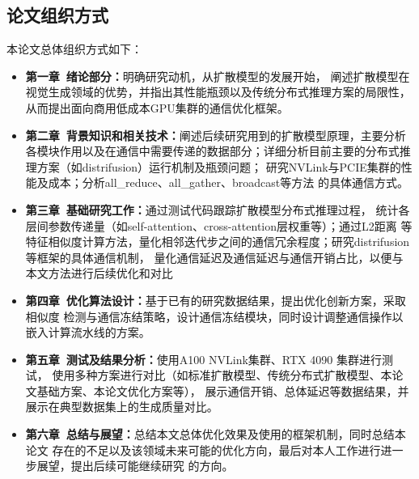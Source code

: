 \subsection{论文组织方式}
\par
本论文总体组织方式如下：
\begin{itemize}
    \item {\bfseries 第一章\ 绪论部分：}明确研究动机，从扩散模型的发展开始，
    阐述扩散模型在视觉生成领域的优势，并指出其性能瓶颈以及传统分布式推理方案的局限性，
    从而提出面向商用低成本GPU集群的通信优化框架。
    \item {\bfseries 第二章\ 背景知识和相关技术：}阐述后续研究用到的扩散模型原理，主要分析
    各模块作用以及在通信中需要传递的数据部分；详细分析目前主要的分布式推理方案（如distrifusion）运行机制及瓶颈问题；
    研究NVLink与PCIE集群的性能及成本；分析all\_reduce、all\_gather、broadcast等方法
    的具体通信方式。
    \item {\bfseries 第三章\ 基础研究工作：}通过测试代码跟踪扩散模型分布式推理过程，
    统计各层间参数传递量（如self-attention、cross-attention层权重等）；通过L2距离
    等特征相似度计算方法，量化相邻迭代步之间的通信冗余程度；研究distrifusion等框架的具体通信机制，
    量化通信延迟及通信延迟与通信开销占比，以便与本文方法进行后续优化和对比
    \item {\bfseries 第四章\ 优化算法设计：}基于已有的研究数据结果，提出优化创新方案，采取相似度
    检测与通信冻结策略，设计通信冻结模块，同时设计调整通信操作以嵌入计算流水线的方案。
    \item {\bfseries 第五章\ 测试及结果分析：}使用A100 NVLink集群、RTX 4090 集群进行测试，
    使用多种方案进行对比（如标准扩散模型、传统分布式扩散模型、本论文基础方案、本论文优化方案等），
    展示通信开销、总体延迟等数据结果，并展示在典型数据集上的生成质量对比。
    \item {\bfseries 第六章\ 总结与展望：}总结本文总体优化效果及使用的框架机制，同时总结本论文
    存在的不足以及该领域未来可能的优化方向，最后对本人工作进行进一步展望，提出后续可能继续研究
    的方向。
\end{itemize}
